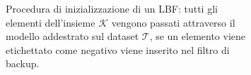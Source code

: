 \documentclass[../../main.tex]{subfiles}
\begin{document}
\begin{figure}[H]
\begin{subfigure}[t]{0.34\textwidth}
            \caption{Procedura di inizializzazione di un LBF: tutti gli elementi dell'insieme $\mathcal{K}$ vengono passati attraverso il modello addestrato sul dataset $\mathcal{T}$, se un elemento viene etichettato come negativo viene inserito nel filtro di backup.}
            \label{fig:LBFInizializzazione}
        \end{subfigure}
        \caption{}
        \label{fig:confrontoInserimento}
    \end{figure}
\end{document}
